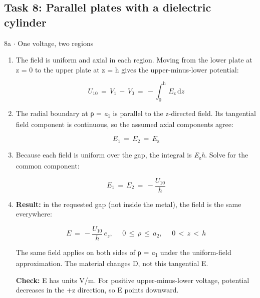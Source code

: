 \documentclass[11pt]{article}
\begin{document}
\begin{keepsection}\subsection{Task 8: Parallel plates with a dielectric cylinder}

\begin{workedbox}{8a \ensuremath{\cdot} One voltage, two regions}
\begin{enumerate}
\item {}
The field is uniform and axial in each region. Moving from the lower plate at z = 0 to the upper plate at z = h gives the upper-minus-lower potential:

\begin{equation*}{U}_{10}\, =\, {V}_{1}\, -\, {V}_{0}\, =\, -\int_{0}^{\mathrm{h}} \, {E}_{\mathrm{z}}\, \mathrm{d}{z}\end{equation*}
\item {}
The radial boundary at ρ = \textit{a}\textsubscript{1} is parallel to the z-directed field. Its tangential field component is continuous, so the assumed axial components agree:

\begin{equation*}{E}_{1}\, =\, {E}_{2}\, =\, {E}_{\mathrm{z}}\end{equation*}
\item {}
Because each field is uniform over the gap, the integral is \textit{E}\textsubscript{z}\textit{h}. Solve for the common component:

\begin{equation*}{E}_{1}\, =\, {E}_{2}\, =\, -\dfrac{{U}_{10}}{{h}}\end{equation*}
\item {}
\textbf{Result:} in the requested gap (not inside the metal), the field is the same everywhere:

\begin{equation*}{E}\, =\, -\dfrac{{U}_{10}}{{h}}\, {e}_{{z}},\, \quad \, 0\, \leq \, ρ\, \leq \, {a}_{2},\, \quad \, 0\, <\, {z}\, <\, {h}\end{equation*}

The same field applies on both sides of ρ = \textit{a}\textsubscript{1} under the uniform-field approximation. The material changes D, not this tangential E.

\textbf{Check:} E has units V/m. For positive upper-minus-lower voltage, potential decreases in the +z direction, so E points downward.
\end{enumerate}
\end{workedbox}

\end{keepsection}
\end{document}
